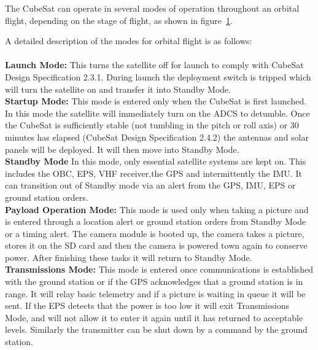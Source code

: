 The CubeSat can operate in several modes of operation throughout an orbital flight, depending on the stage of flight, as shown in figure~\ref{fig:modes}.

\begin{figure}[H]
	\label{fig:modes}
\end{figure}

A detailed description of the modes for orbital flight is as follows: \\ \\
\noindent
\textbf{Launch Mode: } This turns the satellite off for launch to comply with CubeSat Design Specification 2.3.1. During launch the deployment switch is tripped which will turn the satellite on and transfer it into Standby Mode. \\
\noindent
\textbf{Startup Mode: }This mode is entered only when the CubeSat is first launched.  In this mode the satellite will immediately turn on the ADCS to detumble.  Once the CubeSat is sufficiently stable (not tumbling in the pitch or roll axis) or 30 minutes has elapsed (CubeSat Design Specification 2.4.2) the antennas and solar panels will be deployed. It will then move into Standby Mode. \\
\noindent
\textbf{Standby Mode }In this mode, only essential satellite systems are kept on.  This includes the OBC, EPS, VHF receiver,the GPS and intermittently the IMU.  It can transition out of Standby mode via an alert from the GPS, IMU, EPS or ground station orders.  \\
\noindent
\textbf{Payload Operation Mode: } This mode is used only when taking a picture and is entered through a location alert or ground station orders from Standby Mode or a timing alert.  The camera module is booted up, the camera takes a picture, stores it on the SD card and then the camera is powered town again to conserve power.  After finishing these tasks it will return to Standby Mode. \\
\noindent
\textbf{Transmissions Mode: } This mode is entered once communications is established with the ground station or if the GPS acknowledges that a ground station is in range.  It will relay basic telemetry and if a picture is waiting in queue it will be sent.  If the EPS detects that the power is too low it will exit Transmissions Mode, and will not allow it to enter it again until it has returned to acceptable levels.  Similarly the transmitter can be shut down by a command by the ground station.\\
